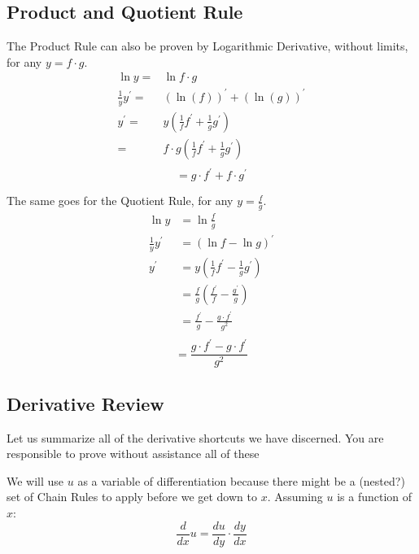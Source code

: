 \subsection{Product and Quotient Rule}
The Product Rule can also be proven by Logarithmic Derivative, without limits, for any 
$y = f\cdot{}g$.
\begin{align*}
\ln{y}  = & \ln{f \cdot{} g}  \\
\frac{1}{y}y^\prime =& \left(\ln(f)\right)^\prime + \left(\ln(g)\right)^\prime \\
y^\prime =& y(\frac{1}{f}f^\prime + \frac{1}{g}g^\prime)  \\
 =& f\cdot{}g(\frac{1}{f}f^\prime + \frac{1}{g}g^\prime)  \\
\end{align*}
\begin{equation}
  =  g\cdot{}f^\prime + f\cdot{}g^\prime
\end{equation}

The same goes for the Quotient Rule, for any $y=\frac{f}{g}$.
\begin{align*}
\ln{y} &= \ln{\frac{f}{g}} \\
\frac{1}{y}y^\prime &= \left(\ln{f} - \ln{g}\right)^\prime \\
y^\prime &= y\left(\frac{1}{f}f^\prime - \frac{1}{g}g^\prime\right) \\
  &= \frac{f}{g}\left(\frac{f^\prime}{f} - \frac{g^\prime}{g}\right) \\
  &= \frac{f^\prime}{g} - \frac{g\cdot{}f^\prime}{g^2}\\
\end{align*}
\begin{equation}
  = \frac{g\cdot{}f^\prime - g\cdot{}f^\prime}{g^2}
\end{equation}

\subsection{Derivative Review}
Let us summarize all of the derivative shortcuts we have discerned.  You are 
responsible to prove without assistance all of these

We will use $u$ as a variable of differentiation because there might be a
(nested?) set of Chain Rules to apply before we get down to $x$.  Assuming
$u$ is a function of $x$:
\begin{equation}
\frac{d}{dx}u = \frac{du}{dy}\cdot{}\frac{dy}{dx}
\end{equation}

